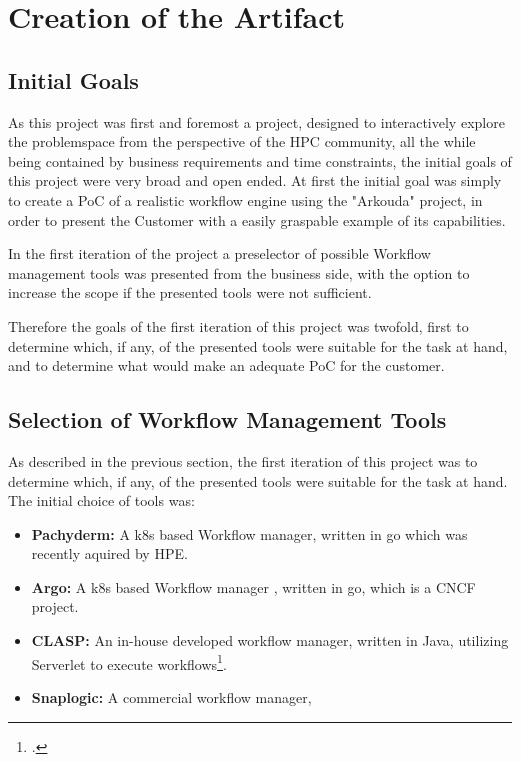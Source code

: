 \chapter{Creation of the Artifact}
\label{creation_of_the_artifact}

\section{Initial Goals}

As this project was first and foremost a project, designed to interactively explore the problemspace from the perspective of the \ac{HPC} community, 
all the while being contained by business requirements and time constraints, the initial goals of this project were very broad and open ended. 
At first the initial goal was simply to create a \ac{PoC} of a realistic workflow engine using the "Arkouda" project,
in order to present the Customer with a easily graspable example of its capabilities.

In the first iteration of the project a preselector of possible Workflow management tools was presented from the business side,
with the option to increase the scope if the presented tools were not sufficient.

Therefore the goals of the first iteration of this project was twofold, first to determine which, if any, of the presented tools were suitable for the task at hand,
and to determine what would make an adequate \ac{PoC} for the customer.

\section{Selection of Workflow Management Tools}

As described in the previous section, the first iteration of this project was to determine which, if any, of the presented tools were suitable for the task at hand.
The initial choice of tools was:

\begin{itemize}
    \item \textbf{Pachyderm:} A \ac{k8s} based Workflow manager, written in go which was recently aquired by \ac{HPE}.
    \item \textbf{Argo:} A \ac{k8s} based Workflow manager , written in go, which is a \ac{CNCF} project.
    \item \textbf{\ac{CLASP}:}  An in-house developed workflow manager, written in Java, utilizing Serverlet to execute workflows\footcite{sayersCloudApplicationServices2015}.
    \item \textbf{Snaplogic:} A commercial workflow manager,
\end{itemize}

